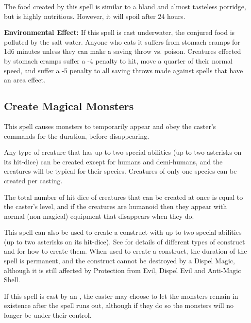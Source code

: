 \begin{multicols*}{2}
The food created by this spell is similar to a bland and almost tasteless porridge, but is highly nutritious. However, it will spoil after 24 hours.

\textbf{Environmental Effect:} If this spell is cast underwater, the conjured food is polluted by the salt water. Anyone who eats it suffers from stomach cramps for 1d6 minutes unless they can make a saving throw vs. poison. Creatures effected by stomach cramps suffer a -4 penalty to hit, move a quarter of their normal speed, and suffer a -5 penalty to all saving throws made against spells that have an area effect.

\subsection{Create Magical Monsters}\label{spell:Create Magical Monsters}

This spell causes monsters to temporarily appear and obey the caster’s commands for the duration, before disappearing.

Any type of creature that has up to two special abilities (up to two asterisks on its hit-dice) can be created except for humans and demi-humans, and the creatures will be typical for their species. Creatures of only one species can be created per casting.

The total number of hit dice of creatures that can be created at once is equal to the caster’s level, and if the creatures are humanoid then they appear with normal (non-magical) equipment that disappears when they do.

This spell can also be used to create a construct with up to two special abilities (up to two asterisks on its hit-dice). See  for details of different types of construct and  for how to create them. When used to create a construct, the duration of the spell is permanent, and the construct cannot be destroyed by a Dispel Magic, although it is still affected by Protection from Evil, Dispel Evil and Anti-Magic Shell.

If this spell is cast by an , the caster may choose to let the monsters remain in existence after the spell runs out, although if they do so the monsters will no longer be under their control.


\end{multicols*}
